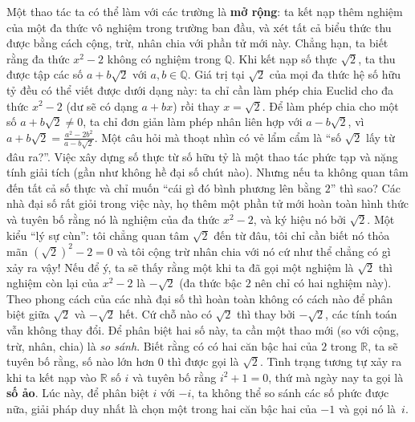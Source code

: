 \begin{multicols}{2}
	\vskip 0.1cm
	Một thao tác ta có thể làm với các trường là {\bf\color{duongvaotoanhoc} mở rộng}: ta kết nạp thêm nghiệm của một đa thức vô nghiệm trong trường ban đầu, và xét tất cả biểu thức thu được bằng cách cộng, trừ, nhân chia với phần tử mới này. Chẳng hạn, ta biết rằng đa thức $x^2 - 2$ không có nghiệm trong $\mathbb{Q}$. Khi kết nạp số thực $\sqrt{2}$, ta thu được tập các số $a + b\sqrt{2}$ với $a,b \in \mathbb{Q}$. Giá trị tại $\sqrt{2}$ của mọi đa thức hệ số hữu tỷ đều có thể viết được dưới dạng này: ta chỉ cần làm phép chia Euclid cho đa thức $x^2 - 2$ (dư sẽ có dạng $a + bx$) rồi thay $x = \sqrt{2}$. Để làm phép chia cho một số $a+b\sqrt{2} \neq 0$, ta chỉ đơn giản làm phép nhân liên hợp với $a-b\sqrt{2}$, vì $a+b\sqrt{2} = \frac{a^2 - 2b^2}{a-b\sqrt{2}}$. 
	\vskip 0.1cm
	Một câu hỏi mà thoạt nhìn có vẻ lẩm cẩm là ``số $\sqrt{2}$ lấy từ đâu ra?''. Việc xây dựng số thực từ số hữu tỷ là một thao tác phức tạp và nặng tính giải tích (gần như không hề đại số chút nào). Nhưng nếu ta không quan tâm đến tất cả số thực và chỉ muốn ``cái gì đó bình phương lên bằng $2$'' thì sao? Các nhà đại số rất giỏi trong việc này, họ thêm một phần tử mới hoàn toàn hình thức và tuyên bố rằng nó là nghiệm của đa thức $x^2 - 2$, và ký hiệu nó bởi $\sqrt{2}$. Một kiểu ``lý sự cùn'': tôi chẳng quan tâm $\sqrt{2}$ đến từ đâu, tôi chỉ cần biết nó thỏa mãn $(\sqrt{2})^2 - 2 = 0$ và tôi cộng trừ nhân chia với nó cứ như thể chẳng có gì xảy ra vậy! Nếu để ý, ta sẽ thấy rằng một khi ta đã gọi một nghiệm là $\sqrt{2}$ thì nghiệm còn lại của $x^2 - 2$ là $-\sqrt{2}$ (đa thức bậc $2$ nên chỉ có hai nghiệm này). Theo phong cách của các nhà đại số thì hoàn toàn không có cách nào để phân biệt giữa $\sqrt{2}$ và $-\sqrt{2}$ hết. Cứ chỗ nào có $\sqrt{2}$ thì thay bởi $-\sqrt{2}$, các tính toán vẫn không thay đổi. Để phân biệt hai số này, ta cần một thao mới (so với cộng, trừ, nhân, chia) là {\it so sánh}. Biết rằng có có hai căn bậc hai của $2$ trong $\mathbb{R}$, ta sẽ tuyên bố rằng, số nào lớn hơn $0$ thì được gọi là $\sqrt{2}$. Tình trạng tương tự xảy ra khi ta kết nạp vào $\mathbb{R}$ số $i$ và tuyên bố rằng $i^2 + 1 = 0$, thứ mà ngày nay ta gọi là {\bf\color{duongvaotoanhoc} số ảo}. Lúc này, để phân biệt $i$ với $-i$, ta không thể so sánh các số phức được nữa, giải pháp duy nhất là chọn một trong hai căn bậc hai của $-1$ và gọi nó là~$i$.
	\vskip 0.1cm

\end{multicols}
